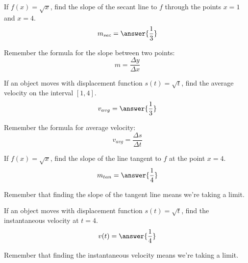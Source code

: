 \documentclass{ximera}
\author{Bobby Ramsey}
\begin{document}
\begin{exercise}
	
	If $f(x) = \sqrt{x}$,
	find the slope of the secant line to $f$ through the points $x=1$ and $x=4$.
	\[ m_{sec} = \answer{\frac{1}{3}} \]
	\begin{hint}
		Remember the formula for the slope between two points:
		\[ m = \frac{\Delta y}{\Delta x} \]
	\end{hint}
	\begin{exercise}
		If an object moves with displacement function 
		$s(t) = \sqrt{t}$, find the average velocity on the interval $[1,4]$.
		\[ v_{avg} = \answer{\frac{1}{3}} \]
		\begin{hint}
			Remember the formula for average velocity:
			\[ v_{avg} = \frac{\Delta s}{\Delta t} \]
		\end{hint}
	\end{exercise}

\end{exercise}

\begin{exercise}
	If $f(x) = \sqrt{x}$, find the slope of the line tangent to $f$ at the point $x=4$.
	\[ m_{tan} = \answer{\frac{1}{4}} \]
	\begin{hint}
		Remember that finding the slope of the tangent line means we're taking a limit.
	\end{hint}
	\begin{exercise}
		If an object moves with displacement function $s(t) = \sqrt{t}$,
		find the instantaneous velocity at $t=4$.
		\[ v(t) = \answer{\frac{1}{4}} \]
		\begin{hint}
			Remember that finding the instantaneous velocity means we're taking a limit.
		\end{hint}
	\end{exercise} 

\end{exercise}
\end{document}

